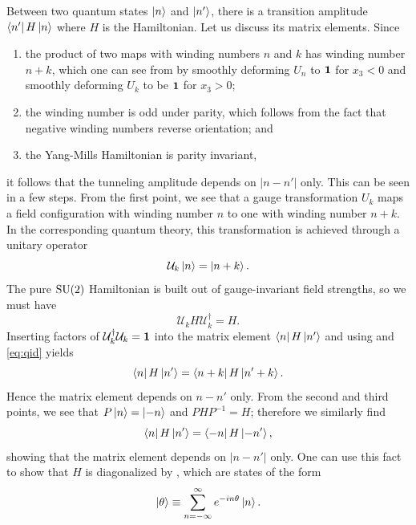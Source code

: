 Between two quantum states $\ket{n}$ and $\ket{n'}$, there is a 
transition amplitude $\bra{n'}H\ket{n}$ where $H$ is the Hamiltonian. 
Let us discuss its matrix elements. Since 
\begin{enumerate}
  \item the product of two maps with winding numbers $n$ and $k$ 
        has winding number $n+k$, which one can see from 
        by smoothly deforming $U_n$ to ${\mathbf 1}$ for $x_3<0$ and
        smoothly deforming $U_k$ to be ${\mathbf 1}$ for $x_3>0$;
  \item the winding number is odd under parity, which follows from the
        fact that negative winding numbers reverse orientation; and
  \item the Yang-Mills Hamiltonian is parity invariant,
\end{enumerate}
it follows that the tunneling amplitude depends on $|n-n'|$ only.
This can be seen in a few steps. From the first point, we see that
a gauge transformation $U_k$ maps a field configuration with
winding number $n$ to one with winding number $n+k$. In the
corresponding quantum theory, this transformation is achieved 
through a unitary operator
\begin{equation}\label{eq:qwn}
  \mathcal{U}_k\ket{n}=\ket{n+k}.
\end{equation}
The pure $\operatorname{SU}(2)$ Hamiltonian is built out of gauge-invariant
field strengths, so we must have 
\begin{equation}\label{eq:qid}
  \mathcal{U}_kH\mathcal{U}_k^\dagger=H.
\end{equation}
Inserting factors of $\mathcal{U}_k^\dagger\mathcal{U}_k={\mathbf 1}$ into
the matrix element $\bra{n}H\ket{n'}$ and using 
and \eqref{eq:qid} yields
\begin{equation}
  \bra{n}H\ket{n'}=\bra{n+k}H\ket{n'+k}.
\end{equation}
Hence the matrix element depends on $n-n'$ only. From the second and
third points, we see that $P\ket{n}=\ket{-n}$ and $PHP^{-1}=H$;
therefore we similarly find
\begin{equation}
  \bra{n}H\ket{n'}=\bra{-n}H\ket{-n'},
\end{equation}
showing that the matrix element depends on $|n-n'|$ only.
One can use this fact to show that $H$ is diagonalized by 
, which are states of the form
\begin{equation}
  \ket{\theta}\equiv\sum\limits_{n=-\infty}^\infty e^{-i n\theta}\ket{n}.
\end{equation}
